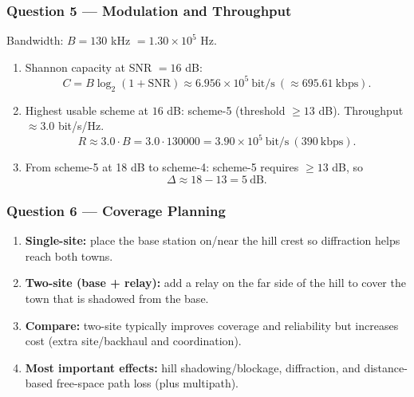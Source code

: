 \documentclass[11pt,a4paper]{article}
\begin{document}
\subsubsection*{Question 5 --- Modulation and Throughput}
Bandwidth: $B=130$ kHz $=1.30\times 10^5$ Hz.

\begin{enumerate}[label=\alph*.]
    \item Shannon capacity at SNR $=16$ dB:
    \[
    C=B\log_2(1+\mathrm{SNR})\approx 6.956\times 10^5\ \text{bit/s}\ (\approx 695.61\ \text{kbps}).
    \]
    \item Highest usable scheme at $16$ dB: scheme-5 (threshold $\ge 13$ dB). Throughput $\approx 3.0$ bit/s/Hz.
    \[
    R\approx 3.0\cdot B=3.0\cdot 130000=3.90\times 10^5\ \text{bit/s}\ (390\ \text{kbps}).
    \]
    \item From scheme-5 at 18 dB to scheme-4: scheme-5 requires $\ge 13$ dB, so
    \[
    \Delta \approx 18-13=5\ \text{dB}.
    \]
\end{enumerate}

\subsubsection*{Question 6 --- Coverage Planning}
\begin{enumerate}[label=\alph*.]
    \item \textbf{Single-site:} place the base station on/near the hill crest so diffraction helps reach both towns.
    \item \textbf{Two-site (base + relay):} add a relay on the far side of the hill to cover the town that is shadowed from the base.
    \item \textbf{Compare:} two-site typically improves coverage and reliability but increases cost (extra site/backhaul and coordination).
    \item \textbf{Most important effects:} hill shadowing/blockage, diffraction, and distance-based free-space path loss (plus multipath).
    
\end{enumerate}
\end{document}

